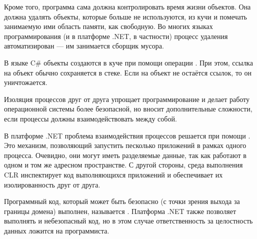Кроме того, программа сама должна контролировать время жизни объектов.
Она должна удалять объекты, которые больше не используются, из кучи и
помечать занимаемую ими область памяти, как свободную. Во многих
языках программирования (и в платформе .NET, в частности) процесс
удаления автоматизирован — им занимается сборщик мусора.

В языке C\# объекты создаются в куче при помощи операции
. При этом, ссылка на объект обычно сохраняется в стеке. Если
на объект не остаётся ссылок, то он уничтожается.


Изоляция процессов друг от друга упрощает программирование и делает
работу операционной системы более безопасной, но вносит дополнительные
сложности, если процессы должны взаимодействовать между собой.

В платформе .NET проблема взаимодействия процессов решается при помощи
. Это механизм, позволяющий
запустить песколько приложений в рамках одного процесса. Очевидно, они
могут иметь разделяемые данные, так как работают в одном и том же
адресном пространстве. С другой стороны, среда выполнения CLR
инспектирует код выполняющихся приложений и обеспечивает их
изолированность друг от друга.

Программный код, который может быть безопасно (с точки зрения выхода
за границы домена) выполнен, называется
. Платформа .NET также позволяет
выполнять и небезопасный код, но в этом случае ответственность за
целостность данных ложится на программиста.
